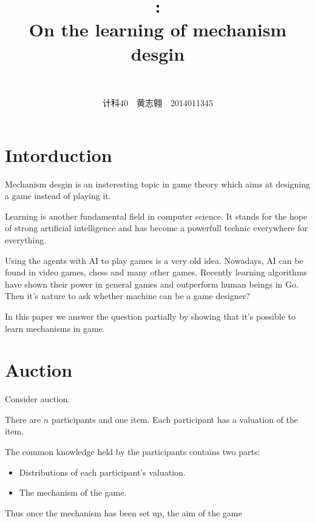 \documentclass{article}
\title{\textmd{\bf \Class: \Title}\\\normalsize\vspace{0.1in}}
\author{\textbf{\StudentName}\ \ \StudentNumber}
\theoremstyle{plain} \newtheorem{theorem}{常识}[section]
\theoremstyle{plain} \newtheorem{lizi}{例}[section]
\begin{document}
\title{On the learning of mechanism desgin}
\author{计科40~~黄志翱~~2014011345}
\maketitle

\section{Intorduction}
Mechanism desgin is an insteresting topic in game theory which aims at designing a game instead of playing it.

Learning is another fundamental field in computer science. It stands for the hope of strong artificial intelligence and has become a powerfull technic everywhere for everything.

Using the agents with AI to play games is a very old idea. Nowadays, AI can be found in video games, chess and many other games. Recently learning algorithms have shown their power in general games and outperform human beings in Go. Then it's nature to ask whether machine can be a game designer?

In this paper we answer the question partially by showing that it's possible to learn mechanisms in game.

\section{Auction}
Consider auction.

There are $n$ participants and one item. Each participant has a valuation of the item.

The common knowledge held by the participants contains two parts:

\begin{itemize}
    \item Distributions of each participant's valuation.
    \item The mechanism of the game.
\end{itemize}

Thus once the mechanism has been set up, the aim of the game
\end{document}
